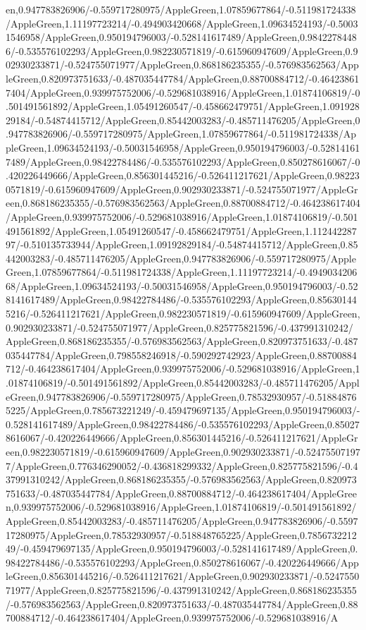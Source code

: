 {\begin{tikzternal}
{en,0.947783826906/-0.559717280975/AppleGreen,1.07859677864/-0.511981724338/AppleGreen,1.11197723214/-0.494903420668/AppleGreen,1.09634524193/-0.50031546958/AppleGreen,0.950194796003/-0.528141617489/AppleGreen,0.98422784486/-0.535576102293/AppleGreen,0.982230571819/-0.615960947609/AppleGreen,0.902930233871/-0.524755071977/AppleGreen,0.868186235355/-0.576983562563/AppleGreen,0.820973751633/-0.487035447784/AppleGreen,0.88700884712/-0.464238617404/AppleGreen,0.939975752006/-0.529681038916/AppleGreen,1.01874106819/-0.501491561892/AppleGreen,1.05491260547/-0.458662479751/AppleGreen,1.09192829184/-0.54874415712/AppleGreen,0.85442003283/-0.485711476205/AppleGreen,0.947783826906/-0.559717280975/AppleGreen,1.07859677864/-0.511981724338/AppleGreen,1.09634524193/-0.50031546958/AppleGreen,0.950194796003/-0.528141617489/AppleGreen,0.98422784486/-0.535576102293/AppleGreen,0.850278616067/-0.420226449666/AppleGreen,0.856301445216/-0.526411217621/AppleGreen,0.982230571819/-0.615960947609/AppleGreen,0.902930233871/-0.524755071977/AppleGreen,0.868186235355/-0.576983562563/AppleGreen,0.88700884712/-0.464238617404/AppleGreen,0.939975752006/-0.529681038916/AppleGreen,1.01874106819/-0.501491561892/AppleGreen,1.05491260547/-0.458662479751/AppleGreen,1.11244228797/-0.510135733944/AppleGreen,1.09192829184/-0.54874415712/AppleGreen,0.85442003283/-0.485711476205/AppleGreen,0.947783826906/-0.559717280975/AppleGreen,1.07859677864/-0.511981724338/AppleGreen,1.11197723214/-0.494903420668/AppleGreen,1.09634524193/-0.50031546958/AppleGreen,0.950194796003/-0.528141617489/AppleGreen,0.98422784486/-0.535576102293/AppleGreen,0.856301445216/-0.526411217621/AppleGreen,0.982230571819/-0.615960947609/AppleGreen,0.902930233871/-0.524755071977/AppleGreen,0.825775821596/-0.437991310242/AppleGreen,0.868186235355/-0.576983562563/AppleGreen,0.820973751633/-0.487035447784/AppleGreen,0.798558246918/-0.590292742923/AppleGreen,0.88700884712/-0.464238617404/AppleGreen,0.939975752006/-0.529681038916/AppleGreen,1.01874106819/-0.501491561892/AppleGreen,0.85442003283/-0.485711476205/AppleGreen,0.947783826906/-0.559717280975/AppleGreen,0.78532930957/-0.518848765225/AppleGreen,0.785673221249/-0.459479697135/AppleGreen,0.950194796003/-0.528141617489/AppleGreen,0.98422784486/-0.535576102293/AppleGreen,0.850278616067/-0.420226449666/AppleGreen,0.856301445216/-0.526411217621/AppleGreen,0.982230571819/-0.615960947609/AppleGreen,0.902930233871/-0.524755071977/AppleGreen,0.776346290052/-0.436818299332/AppleGreen,0.825775821596/-0.437991310242/AppleGreen,0.868186235355/-0.576983562563/AppleGreen,0.820973751633/-0.487035447784/AppleGreen,0.88700884712/-0.464238617404/AppleGreen,0.939975752006/-0.529681038916/AppleGreen,1.01874106819/-0.501491561892/AppleGreen,0.85442003283/-0.485711476205/AppleGreen,0.947783826906/-0.559717280975/AppleGreen,0.78532930957/-0.518848765225/AppleGreen,0.785673221249/-0.459479697135/AppleGreen,0.950194796003/-0.528141617489/AppleGreen,0.98422784486/-0.535576102293/AppleGreen,0.850278616067/-0.420226449666/AppleGreen,0.856301445216/-0.526411217621/AppleGreen,0.902930233871/-0.524755071977/AppleGreen,0.825775821596/-0.437991310242/AppleGreen,0.868186235355/-0.576983562563/AppleGreen,0.820973751633/-0.487035447784/AppleGreen,0.88700884712/-0.464238617404/AppleGreen,0.939975752006/-0.529681038916/A}
\end{tikzternal}}
